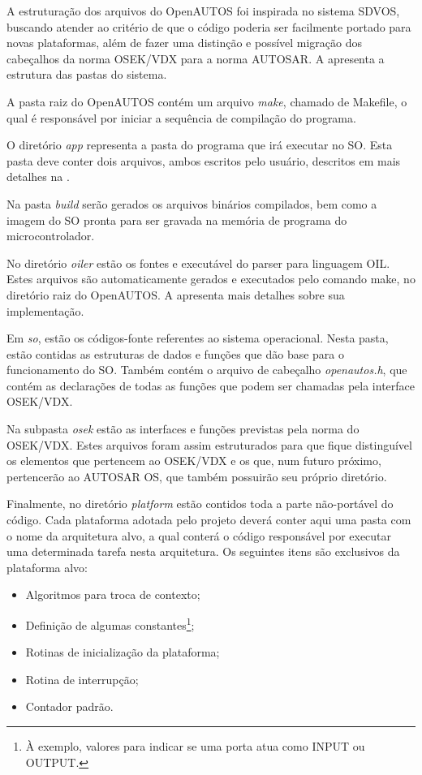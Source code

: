	A estruturação dos arquivos do OpenAUTOS foi inspirada no sistema SDVOS, buscando atender ao critério de que o código poderia ser facilmente portado para novas plataformas, além de fazer uma distinção e possível migração dos cabeçalhos da norma OSEK/VDX para a norma AUTOSAR. A  apresenta a estrutura das pastas do sistema.


A pasta raiz do OpenAUTOS contém um arquivo \emph{make}, chamado de Makefile, o qual é responsável por iniciar a sequência de compilação do programa.

O diretório \emph{app} representa a pasta do programa que irá executar no SO. Esta pasta deve conter dois arquivos, ambos escritos pelo usuário, descritos em mais detalhes na .

Na pasta \emph{build} serão gerados os arquivos binários compilados, bem como a imagem do SO pronta para ser gravada na memória de programa do microcontrolador.

No diretório \emph{oiler} estão os fontes e executável do parser para linguagem OIL. Estes arquivos são automaticamente gerados e executados pelo comando make, no diretório raiz do OpenAUTOS. A  apresenta mais detalhes sobre sua implementação.

Em \emph{so}, estão os códigos-fonte referentes ao sistema operacional. Nesta pasta, estão contidas as estruturas de dados e funções que dão base para o funcionamento do SO. Também contém o arquivo de cabeçalho \emph{openautos.h}, que contém as declarações de todas as funções que podem ser chamadas pela interface OSEK/VDX. 

Na subpasta \emph{osek} estão as interfaces e funções previstas pela norma do OSEK/VDX. Estes arquivos foram assim estruturados para que fique distinguível os elementos que pertencem ao OSEK/VDX e os que, num futuro próximo, pertencerão ao AUTOSAR OS, que também possuirão seu próprio diretório.

Finalmente, no diretório \emph{platform} estão contidos toda a parte não-portável do código. Cada plataforma adotada pelo projeto deverá conter aqui uma pasta com o nome da arquitetura alvo, a qual conterá o código responsável por executar uma determinada tarefa nesta arquitetura. Os seguintes itens são exclusivos da plataforma alvo:

\begin{itemize}
	\item Algoritmos para troca de contexto;
	\item Definição de algumas constantes\footnote{À exemplo, valores para indicar se uma porta atua como INPUT ou OUTPUT.};
	\item Rotinas de inicialização da plataforma;
	\item Rotina de interrupção;
	\item Contador padrão.
\end{itemize}

